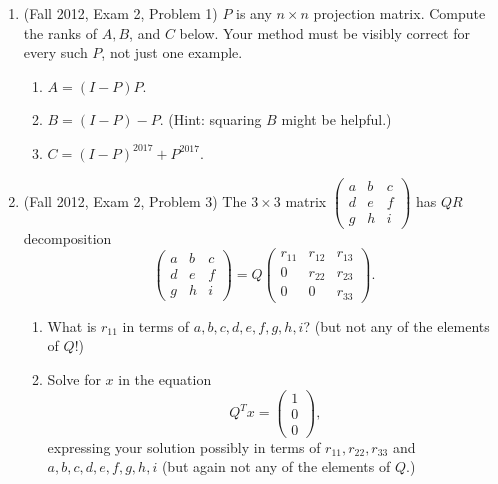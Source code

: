 \documentclass[11pt]{article}
\begin{document}
\begin{enumerate}
\item (Fall 2012, Exam 2, Problem 1) $P$ is any $n \times n$ projection matrix.  Compute the ranks of $A, B$, and $C$ below.  Your method must be visibly correct for every such $P$, not just one example.
\begin{enumerate}

\item $A = (I-P)P$.

\item $B = (I-P) - P$.  (Hint: squaring $B$ might be helpful.)

\item $C = (I-P)^{2017} + P^{2017}$.

\end{enumerate}

\item (Fall 2012, Exam 2, Problem 3) The $3 \times 3$ matrix $\begin{pmatrix} a & b & c \\ d & e & f \\ g & h & i \end{pmatrix}$ has $QR$ decomposition
\[\begin{pmatrix} a & b & c \\ d & e & f \\ g & h & i \end{pmatrix} = Q \begin{pmatrix} r_{11} & r_{12} & r_{13} \\ 0 & r_{22} & r_{23} \\ 0 & 0 & r_{33} \end{pmatrix}. \]
\begin{enumerate}

\item What is $r_{11}$ in terms of $a,b,c,d,e,f,g,h,i$? (but not any of the elements of $Q$!)


\item Solve for $x$ in the equation
\[ Q^T x = \begin{pmatrix} 1 \\ 0 \\ 0 \end{pmatrix}, \]
expressing your solution possibly in terms of $r_{11}, r_{22}, r_{33}$ and $a,b,c,d,e,f,g,h,i$ (but again not any of the elements of $Q$.)

\end{enumerate}







\end{enumerate}
\end{document}
